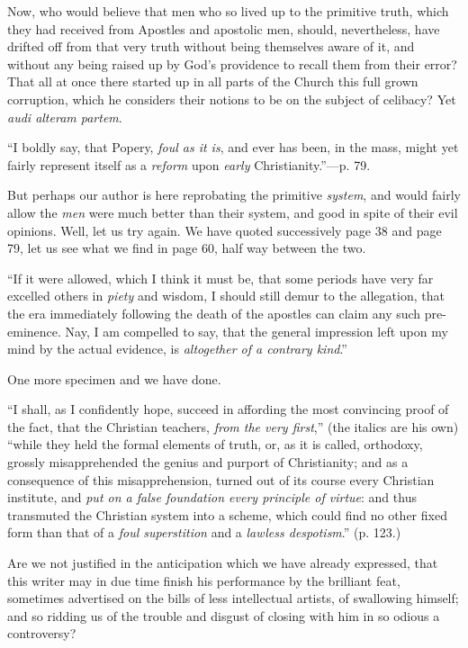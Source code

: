 Now, who would believe that men who so lived up to
the primitive truth, which they had received from Apostles and apostolic
men, should, nevertheless, have drifted off from that very truth
without being themselves aware of it, and without any being raised up by
God's providence to recall them from their error? That all at once there
started up in all parts of the Church this full grown corruption, which
he considers their notions to be on the subject of celibacy? Yet \emph{audi
alteram partem}.

``I boldly say, that Popery, \emph{foul as it is},
and ever has been, in the mass, might yet fairly represent itself as a \emph{reform}
upon \emph{early} Christianity.''—p. 79.

But perhaps our author is here reprobating the
primitive \emph{system}, and would fairly allow the \emph{men} were much
better than their system, and good in spite of their evil opinions.
Well, let us try again. We have quoted successively page 38 and page 79,
let us see what we find in page 60, half way between the two.

``If it were allowed, which I think it must be, that
some periods have very far excelled others in \emph{piety} and wisdom, I
should still demur to the allegation, that the era immediately following
the death of the apostles can claim any such pre-eminence. Nay, I am
compelled to say, that the general impression left upon my mind by the
actual evidence, is \emph{altogether of a contrary kind}.''

One more specimen and we have done.

``I shall, as I confidently hope, succeed in
affording the most convincing proof of the fact, that the Christian
teachers, \emph{from the very first},'' (the italics are his own) ``while
they held the formal elements of truth, or, as it is called, orthodoxy,
grossly misapprehended the genius and purport of Christianity; and as a
consequence of this misapprehension, turned out of its course every
Christian institute, and \emph{put on a false foundation every principle of
virtue}: and thus transmuted the Christian system into a scheme,
which could find no other fixed form than that of a \emph{foul superstition}
and a \emph{lawless despotism}.'' (p. 123.)

Are we not justified in the anticipation which we
have already expressed, that this writer may in due time finish his
performance by the brilliant feat, sometimes advertised on the bills of
less intellectual artists, of swallowing himself; and so ridding us of
the trouble and disgust of closing with him in so odious a controversy?

